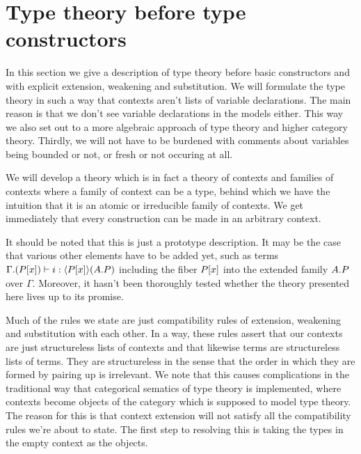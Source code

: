 \section{Type theory before type constructors}\label{tt}
In this section we give a description of type theory before basic
constructors and with explicit extension, weakening and substitution. We will
formulate the type theory in such a way that contexts aren't lists of variable
declarations. The main reason is that we don't see variable declarations in the
models either. This way we also set out to a more algebraic approach of type
theory and higher category theory. Thirdly, we will not have to be burdened with
comments about variables being bounded or not, or fresh or not occuring at all.

We will develop a theory which is in fact a theory of contexts and families of
contexts where a family of context can be a type, behind which we have the
intuition that it is an atomic or irreducible family of contexts. We get immediately
that every construction can be made in an arbitrary context. 

It should be noted that this is just a prototype description. It may be the case
that various other elements have to be added yet, such as terms
$\jterm{{\Gamma}{\subst{x}{P}}}{\ctxwk{\subst{x}{P}}{\ctxext{A}{P}}}{i}$
including the fiber $\subst{x}{P}$ into the extended family $\ctxext{A}{P}$ over
$\Gamma$. Moreover, it hasn't been thoroughly tested whether the theory presented
here lives up to its promise.

Much of the rules we state are just compatibility rules of extension, weakening
and substitution with each other. In a way, these rules assert that our contexts
are just structureless lists of contexts and that likewise terms are structureless
lists of terms. They are structureless in the sense that the order in which
they are formed by pairing up is irrelevant. We note that this causes complications
in the traditional way that categorical sematics of type theory is implemented,
where contexts become objects of the category which is supposed to model type
theory. The reason for this is that context extension will not satisfy all the
compatibility rules we're about to state. The first step to resolving this is taking
the types in the empty context as the objects. 

